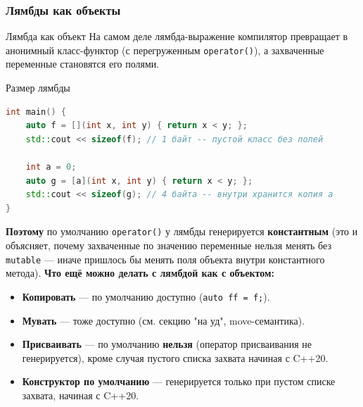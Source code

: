 \subsubsection{Лямбды как объекты}
\begin{definition}{Лямбда как объект}{}
На самом деле лямбда-выражение компилятор превращает в анонимный класс-функтор (с перегруженным \texttt{operator()}), а захваченные переменные становятся его полями.
\end{definition}
\begin{implementation}{Размер лямбды}{}
\begin{lstlisting}[language=C++]
int main() {
    auto f = [](int x, int y) { return x < y; };
    std::cout << sizeof(f); // 1 байт -- пустой класс без полей

    int a = 0;
    auto g = [a](int x, int y) { return x < y; };
    std::cout << sizeof(g); // 4 байта -- внутри хранится копия a
}
\end{lstlisting}
\end{implementation}
\textbf{Поэтому} по умолчанию \texttt{operator()} у лямбды генерируется \textbf{константным} (это и объясняет, почему захваченные по значению переменные нельзя менять без \texttt{mutable} --- иначе пришлось бы менять поля объекта внутри константного метода).
\textbf{Что ещё можно делать с лямбдой как с объектом:}
\begin{itemize}
  \item \textbf{Копировать} --- по умолчанию доступно (\texttt{auto ff = f;}).
  \item \textbf{Мувать} --- тоже доступно (см. секцию "на уд", move-семантика).
  \item \textbf{Присваивать} --- по умолчанию \textbf{нельзя} (оператор присваивания не генерируется), кроме случая пустого списка захвата начиная с C++20.
  \item \textbf{Конструктор по умолчанию} --- генерируется только при пустом списке захвата, начиная с C++20.
\end{itemize}
